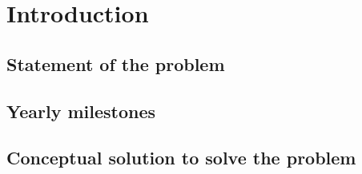 \section*{Introduction} \label{sec:intro}

\subsection*{Statement of the problem} \label{subsec:intro-problem}



\subsection*{Yearly milestones} \label{subsec:intro-milestones}




\subsection*{Conceptual solution to solve the problem} \label{subsec:intro-solution}

